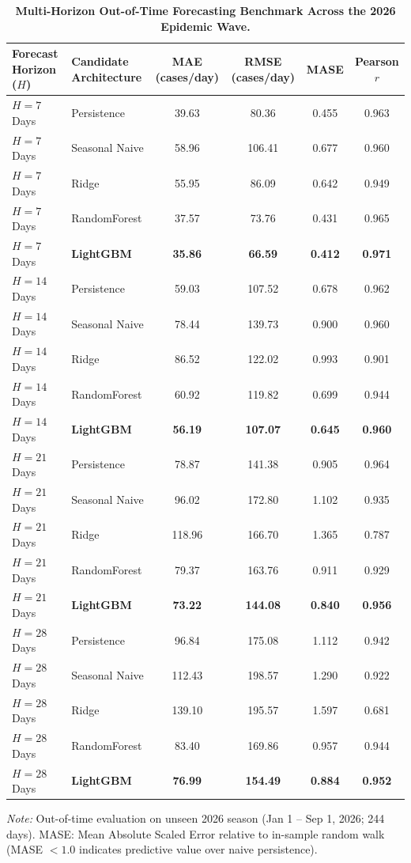 \documentclass[11pt,a4paper]{article}
\begin{document}
\begin{table}[t]
\centering
\small
\caption{\textbf{Multi-Horizon Out-of-Time Forecasting Benchmark Across the 2026 Epidemic Wave.}}
\label{tab:table3}
\begin{tabular*}{\textwidth}{@{\extracolsep{\fill}}llcccc@{}}
\toprule
\textbf{Forecast Horizon ($H$)} & \textbf{Candidate Architecture} & \textbf{MAE (cases/day)} & \textbf{RMSE (cases/day)} & \textbf{MASE} & \textbf{Pearson $r$} \\
\midrule
$H=7$ Days & Persistence & 39.63 & 80.36 & 0.455 & 0.963 \\
$H=7$ Days & Seasonal Naive & 58.96 & 106.41 & 0.677 & 0.960 \\
$H=7$ Days & Ridge & 55.95 & 86.09 & 0.642 & 0.949 \\
$H=7$ Days & RandomForest & 37.57 & 73.76 & 0.431 & 0.965 \\
$H=7$ Days & \textbf{LightGBM} & \textbf{35.86} & \textbf{66.59} & \textbf{0.412} & \textbf{0.971} \\
\midrule
$H=14$ Days & Persistence & 59.03 & 107.52 & 0.678 & 0.962 \\
$H=14$ Days & Seasonal Naive & 78.44 & 139.73 & 0.900 & 0.960 \\
$H=14$ Days & Ridge & 86.52 & 122.02 & 0.993 & 0.901 \\
$H=14$ Days & RandomForest & 60.92 & 119.82 & 0.699 & 0.944 \\
$H=14$ Days & \textbf{LightGBM} & \textbf{56.19} & \textbf{107.07} & \textbf{0.645} & \textbf{0.960} \\
\midrule
$H=21$ Days & Persistence & 78.87 & 141.38 & 0.905 & 0.964 \\
$H=21$ Days & Seasonal Naive & 96.02 & 172.80 & 1.102 & 0.935 \\
$H=21$ Days & Ridge & 118.96 & 166.70 & 1.365 & 0.787 \\
$H=21$ Days & RandomForest & 79.37 & 163.76 & 0.911 & 0.929 \\
$H=21$ Days & \textbf{LightGBM} & \textbf{73.22} & \textbf{144.08} & \textbf{0.840} & \textbf{0.956} \\
\midrule
$H=28$ Days & Persistence & 96.84 & 175.08 & 1.112 & 0.942 \\
$H=28$ Days & Seasonal Naive & 112.43 & 198.57 & 1.290 & 0.922 \\
$H=28$ Days & Ridge & 139.10 & 195.57 & 1.597 & 0.681 \\
$H=28$ Days & RandomForest & 83.40 & 169.86 & 0.957 & 0.944 \\
$H=28$ Days & \textbf{LightGBM} & \textbf{76.99} & \textbf{154.49} & \textbf{0.884} & \textbf{0.952} \\
\bottomrule
\end{tabular*}
\begin{flushleft}
\footnotesize{\textit{Note:} Out-of-time evaluation on unseen 2026 season (Jan 1 -- Sep 1, 2026; 244 days). MASE: Mean Absolute Scaled Error relative to in-sample random walk (MASE $< 1.0$ indicates predictive value over naive persistence).}
\end{flushleft}
\end{table}
\end{document}
